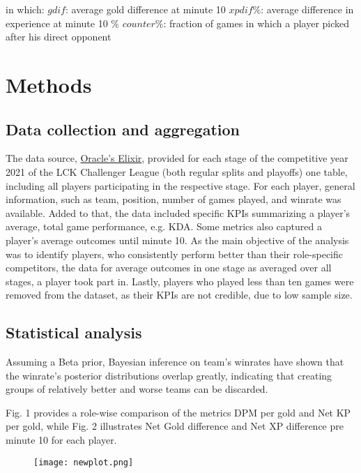 \documentclass{article}
\begin{document}
in which: \newline
$gdif$: average gold difference at minute 10 \newline
$xpdif\%$: average difference in experience at minute 10 $\%$ \newline
$counter\%$: fraction of games in which a player picked after his direct opponent  
\section{Methods}
\subsection{Data collection and aggregation}
The data source,
\href{https://oracleselixir.com/stats/players/byTournament}{Oracle's Elixir}, provided for each  stage of the competitive year 2021 of the LCK Challenger League (both regular splits and playoffs) one table, including all players participating in the respective stage. For each player, general information, such as team, position, number of games played, and winrate was available. Added to that, the data included specific KPIs summarizing a player's average, total game performance, e.g. KDA. Some metrics also captured a player's average outcomes until minute 10. \newline
As the main objective of the analysis was to identify players, who consistently perform better than their role-specific competitors, the data for average outcomes in one stage as averaged over all stages, a player took part in. Lastly, players who played less than ten games were removed from the dataset, as their KPIs are not credible, due to low sample size. 
\subsection{Statistical analysis}
Assuming a Beta prior, Bayesian inference on team's winrates have shown that the winrate's posterior distributions overlap greatly, indicating that creating groups of relatively better and worse teams can be discarded. 


Fig. 1 provides a role-wise comparison of the metrics DPM per gold and Net KP per gold, while Fig. 2 illustrates Net Gold difference and Net XP difference pre minute 10 for each player.

\begin{figure}
\texttt{[image: newplot.png]}
\end{figure}
\end{document}
